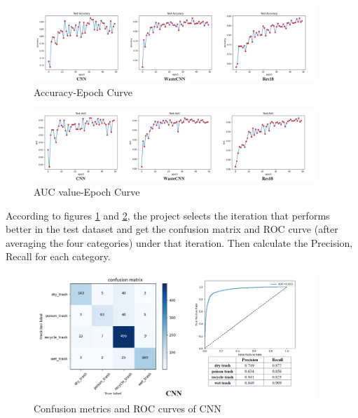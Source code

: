 \documentclass{article}
\begin{document}
\begin{figure}[!h]
    \begin{centering}
    \includegraphics[width=0.95\textwidth]{accuracy.png}
    \par\end{centering}
    \caption{Accuracy-Epoch Curve}
    \label{fig:Accuracy}
\end{figure}

\begin{figure}[!h]
    \begin{centering}
    \includegraphics[width=0.95\textwidth]{AUC.png}
    \par\end{centering}
    \caption{AUC value-Epoch Curve}
    \label{fig:AUC}
\end{figure}

According to figures \ref{fig:Accuracy} and \ref{fig:AUC}, the project selects the iteration that performs better in the test dataset and get the confusion matrix and ROC curve (after averaging the four categories) under that iteration. Then calculate the Precision, Recall for each category.

\begin{figure}[!h]
    \begin{centering}
    \includegraphics[width=0.95\textwidth]{CNN_eva.png}
    \par\end{centering}
    \caption{Confusion metrics and ROC curves of CNN}
    \label{fig:CNN_confusion_ROC}
\end{figure}
\end{document}
